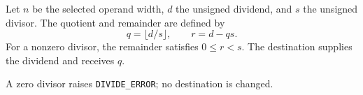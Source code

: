Let \(n\) be the selected operand width, \(d\) the unsigned dividend, and \(s\) the unsigned divisor. The quotient and remainder are defined by
\[
  q = \lfloor d/s \rfloor,
  \qquad r = d - qs .
\]
For a nonzero divisor, the remainder satisfies \(0 \le r < s\). The destination supplies the dividend and receives \(q\).

A zero divisor raises \texttt{DIVIDE\_ERROR}; no destination is changed.
